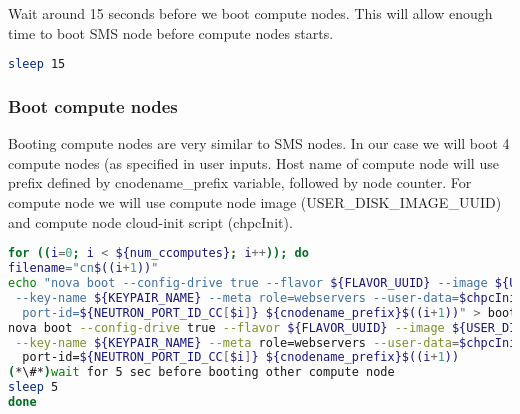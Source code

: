 Wait around 15 seconds before we boot compute nodes. This will allow enough time to boot SMS node before compute nodes starts. 

\begin{lstlisting}[language=bash,keywords={}]
sleep 15
\end{lstlisting}

\subsubsection{Boot compute nodes}

Booting compute nodes are very similar to SMS nodes. In our case we will boot 4 compute nodes (as specified in user inputs. Host name of compute node will use prefix defined by cnodename\_prefix variable, followed by node counter. For compute node we will use compute node image (USER\_DISK\_IMAGE\_UUID) and compute node cloud-init script (chpcInit). 


\begin{lstlisting}[language=bash,keywords={}]
for ((i=0; i < ${num_ccomputes}; i++)); do
filename="cn$((i+1))"
echo "nova boot --config-drive true --flavor ${FLAVOR_UUID} --image ${USER_DISK_IMAGE_UUID} \
 --key-name ${KEYPAIR_NAME} --meta role=webservers --user-data=$chpcInit --nic \
  port-id=${NEUTRON_PORT_ID_CC[$i]} ${cnodename_prefix}$((i+1))" > boot_$filename
nova boot --config-drive true --flavor ${FLAVOR_UUID} --image ${USER_DISK_IMAGE_UUID} \
 --key-name ${KEYPAIR_NAME} --meta role=webservers --user-data=$chpcInit --nic \
  port-id=${NEUTRON_PORT_ID_CC[$i]} ${cnodename_prefix}$((i+1))
(*\#*)wait for 5 sec before booting other compute node
sleep 5
done
\end{lstlisting}
